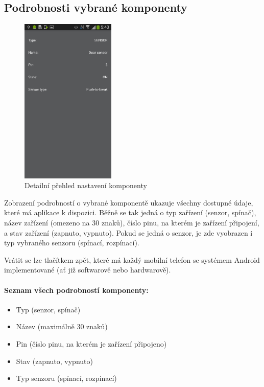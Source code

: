 \documentclass[FM,DP]{tulthesis}  %
\begin{document}
\subsection{Podrobnosti vybrané komponenty}
\begin{figure}[H]
\begin{center}
\includegraphics[width=0.4\textwidth]{images/app2.png}
\caption{Detailní přehled nastavení komponenty}
\label{image}
\end{center}
\end{figure}

Zobrazení podrobností o vybrané komponentě ukazuje všechny dostupné údaje, které má aplikace k dispozici. Běžně se tak jedná o typ zařízení (senzor, spínač), název zařízení (omezeno na 30 znaků), číslo pinu, na kterém je zařízení připojení, a stav zařízení (zapnuto, vypnuto). Pokud se jedná o senzor, je zde vyobrazen i typ vybraného senzoru (spínací, rozpínací).

Vrátit se lze tlačítkem zpět, které má každý mobilní telefon se systémem Android implementované (ať již softwarově nebo hardwarově).

\paragraph{Seznam všech podrobností komponenty:}
\begin{itemize}
\item Typ (senzor, spínač)
\item Název (maximálně 30 znaků)
\item Pin (číslo pinu, na kterém je zařízení připojeno)
\item Stav (zapnuto, vypnuto)
\item Typ senzoru (spínací, rozpínací)
\end{itemize}
\end{document}
